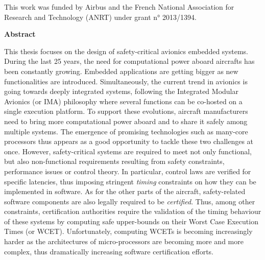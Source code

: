 \documentclass[main.tex]{subfiles}
\begin{document}
%
%
%
%
%
%

\mbox{}\vspace{8cm}
\begin{center}
    \large
    This work was funded by Airbus and the French National Association for Research and Technology (ANRT) under grant n° 2013/1394.
\end{center}

\cleardoublepage

\begin{center} \LARGE \bf
Abstract
\vspace{5mm} \end{center}
This thesis focuses on the design of safety-critical avionics embedded systems. During the last 25 years, the need for computational power aboard aircrafts has been constantly growing. Embedded applications are getting bigger as new functionalities are introduced. Simultaneously, the current trend in avionics is going towards deeply integrated systems, following the Integrated Modular Avionics (or IMA) philosophy where several functions can be co-hosted on a single execution platform. To support these evolutions, aircraft manufacturers need to bring more computational power aboard and to share it safely among multiple systems. The emergence of promising technologies such as many-core processors thus appears as a good opportunity to tackle these two challenges at once.
However, safety-critical systems are required to meet not only functional, but also non-functional requirements resulting from safety constraints, performance issues or control theory. In particular, control laws are verified for specific latencies, thus imposing stringent \emph{timing} constraints on how they can be implemented in software. As for the other parts of the aircraft, safety-related software components are also legally required to be \emph{certified}. Thus, among other constraints, certification authorities require the validation of the timing behaviour of these systems by computing safe upper-bounds on their Worst Case Execution Times (or WCET). Unfortunately, computing WCETs is becoming increasingly harder as the architectures of micro-processors are becoming more and more complex, thus dramatically increasing software certification efforts.\\
\end{document}
